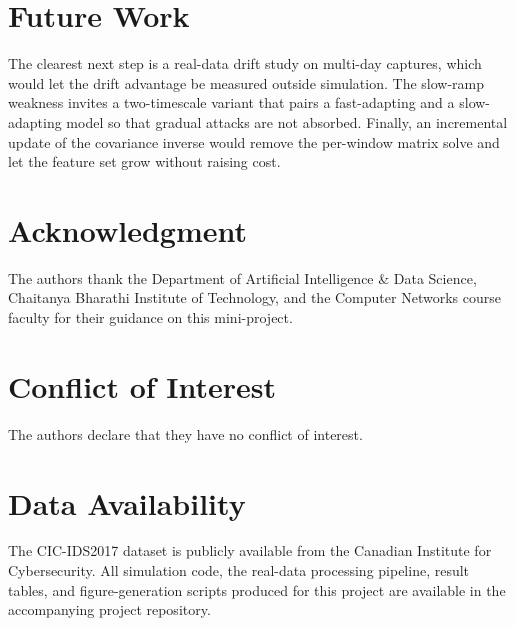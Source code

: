 \documentclass[11pt,a4paper]{article}
\begin{document}
\section{Future Work}
The clearest next step is a real-data drift study on multi-day captures, which
would let the drift advantage be measured outside simulation. The slow-ramp
weakness invites a two-timescale variant that pairs a fast-adapting and a
slow-adapting model so that gradual attacks are not absorbed. Finally, an
incremental update of the covariance inverse would remove the per-window matrix
solve and let the feature set grow without raising cost.

\section*{Acknowledgment}
The authors thank the Department of Artificial Intelligence \& Data Science,
Chaitanya Bharathi Institute of Technology, and the Computer Networks course
faculty for their guidance on this mini-project.

\section*{Conflict of Interest}
The authors declare that they have no conflict of interest.

\section*{Data Availability}
The CIC-IDS2017 dataset is publicly available from the Canadian Institute for
Cybersecurity. All simulation code, the real-data processing pipeline, result
tables, and figure-generation scripts produced for this project are available in
the accompanying project repository.
\end{document}
